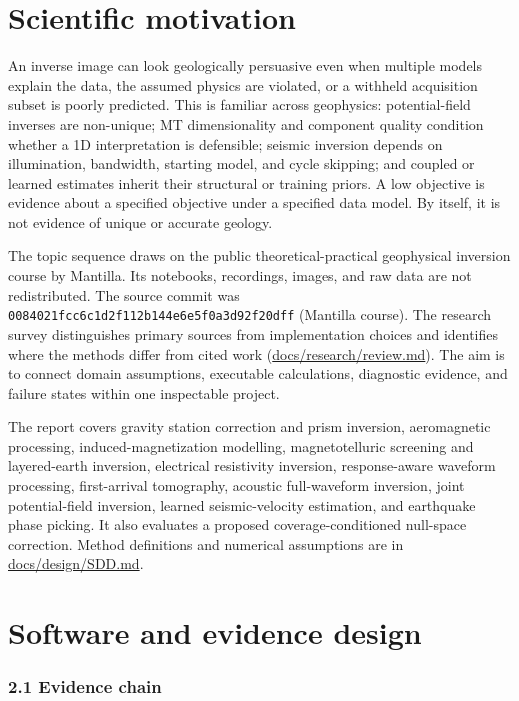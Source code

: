 \section{Scientific motivation}\label{scientific-motivation}

An inverse image can look geologically persuasive even when multiple
models explain the data, the assumed physics are violated, or a withheld
acquisition subset is poorly predicted. This is familiar across
geophysics: potential-field inverses are non-unique; MT dimensionality
and component quality condition whether a 1D interpretation is
defensible; seismic inversion depends on illumination, bandwidth,
starting model, and cycle skipping; and coupled or learned estimates
inherit their structural or training priors. A low objective is evidence
about a specified objective under a specified data model. By itself, it
is not evidence of unique or accurate geology.

The topic sequence draws on the public theoretical-practical geophysical
inversion course by Mantilla. Its notebooks, recordings, images, and raw
data are not redistributed. The source commit was
\texttt{0084021fcc6c1d2f112b144e6e5f0a3d92f20dff} (Mantilla course). The
research survey distinguishes primary sources from implementation
choices and identifies where the methods differ from cited work
(\url{docs/research/review.md}). The aim is to connect domain
assumptions, executable calculations, diagnostic evidence, and failure
states within one inspectable project.

The report covers gravity station correction and prism inversion,
aeromagnetic processing, induced-magnetization modelling,
magnetotelluric screening and layered-earth inversion, electrical
resistivity inversion, response-aware waveform processing, first-arrival
tomography, acoustic full-waveform inversion, joint potential-field
inversion, learned seismic-velocity estimation, and earthquake phase
picking. It also evaluates a proposed coverage-conditioned null-space
correction. Method definitions and numerical assumptions are in
\url{docs/design/SDD.md}.

\section{Software and evidence
design}\label{software-and-evidence-design}

\subsubsection{2.1 Evidence chain}\label{evidence-chain}

